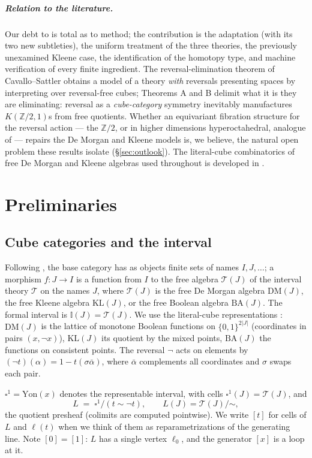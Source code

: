 \documentclass[11pt]{amsart}
\theoremstyle{definition}
\newcommand{\I}{\mathbb{I}}
\newcommand{\DM}{\mathrm{DM}}
\newcommand{\KL}{\mathrm{KL}}
\newcommand{\BA}{\mathrm{BA}}
\newcommand{\Ldash}{L}
\begin{document}
\subparagraph*{Relation to the literature.}  Our debt to
\cite{CoqNote} is total as to method; the contribution is the
adaptation (with its two new subtleties), the uniform treatment of
the three theories, the previously unexamined Kleene case, the
identification of the homotopy type, and machine verification of
every finite ingredient.  The reversal-elimination theorem of
Cavallo--Sattler \cite{CavalloSattlerRev} obtains a model of a
theory \emph{with} reversals presenting spaces by interpreting over
reversal-free cubes; Theorems A and B delimit what it is they are
eliminating: reversal as a \emph{cube-category} symmetry inevitably
manufactures $K(\mathbb{Z}/2,1)$s from free quotients.  Whether an
equivariant fibration structure for the reversal action --- the
$\mathbb{Z}/2$, or in higher dimensions hyperoctahedral, analogue
of \cite{ACCRS} --- repairs the De Morgan and Kleene models is, we
believe, the natural open problem these results isolate
(\S\ref{sec:outlook}).  The literal-cube combinatorics of free De
Morgan and Kleene algebras used throughout is developed in
\cite{DMFibers, Kleene}.

\section{Preliminaries}
\label{sec:prelim}

\subsection{Cube categories and the interval}

Following \cite[\S1]{CoqNote}, the base category has as objects
finite sets of names $I, J, \dots$; a morphism $f : J \to I$ is a
function from $I$ to the free algebra $\mathcal{T}(J)$ of the
interval theory $\mathcal{T}$ on the names $J$, where
$\mathcal{T}(J)$ is the free De Morgan algebra $\DM(J)$, the free
Kleene algebra $\KL(J)$, or the free Boolean algebra $\BA(J)$.  The
formal interval is $\I(J) = \mathcal{T}(J)$.  We use the
literal-cube representations \cite{DMFibers, Kleene}: $\DM(J)$ is
the lattice of monotone Boolean functions on $\{0,1\}^{2|J|}$
(coordinates in pairs $(x, \neg x)$), $\KL(J)$ its quotient by the
mixed points, $\BA(J)$ the functions on consistent points.  The
reversal $\neg$ acts on elements by
$(\neg t)(\alpha) = 1 - t(\sigma\bar\alpha)$, where $\bar\alpha$
complements all coordinates and $\sigma$ swaps each pair.

$\square^1 = \mathrm{Yon}(x)$ denotes the representable interval,
with cells $\square^1(J) = \mathcal{T}(J)$, and
\[
  \Ldash \;=\; \square^1 / (t \sim \neg t),
  \qquad \Ldash(J) = \mathcal{T}(J)/\mathord{\sim},
\]
the quotient presheaf (colimits are computed pointwise).  We write
$[t]$ for cells of $\Ldash$ and $\ell(t)$ when we think of them as
reparametrizations of the generating line.  Note
$[0] = [1]$: $\Ldash$ has a single vertex $\ell_0$, and the
generator $[x]$ is a loop at it.
\end{document}
